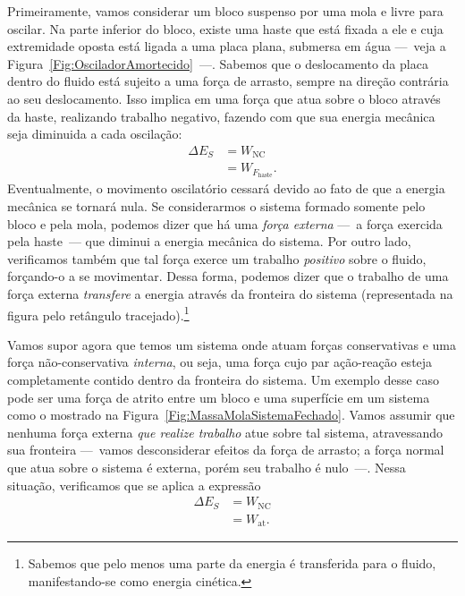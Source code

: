 Primeiramente, vamos considerar um bloco suspenso por uma mola e livre para oscilar. Na parte inferior do bloco, existe uma haste que está fixada a ele e cuja extremidade oposta está ligada a uma placa plana, submersa em água ---~veja a Figura~\ref{Fig:OsciladorAmortecido}~---. Sabemos que o deslocamento da placa dentro do fluido está sujeito a uma força de arrasto, sempre na direção contrária ao seu deslocamento. Isso implica em uma força que atua sobre o bloco através da haste, realizando trabalho negativo, fazendo com que sua energia mecânica seja diminuida a cada oscilação:
\begin{align}
    \Delta E_S &= W_{\textrm{NC}} \\
    &= W_{F_{\textrm{haste}}}.
\end{align}
%
Eventualmente, o movimento oscilatório cessará devido ao fato de que a energia mecânica se tornará nula. Se considerarmos o sistema formado somente pelo bloco e pela mola, podemos dizer que há uma \emph{força externa} ---~a força exercida pela haste~--- que diminui a energia mecânica do sistema. Por outro lado, verificamos também que tal força exerce um trabalho \emph{positivo} sobre o fluido, forçando-o a se movimentar. Dessa forma, podemos dizer que o trabalho de uma força externa \emph{transfere} a energia através da fronteira do sistema (representada na figura pelo retângulo tracejado).\footnote{Sabemos que pelo menos uma parte da energia é transferida para o fluido, manifestando-se como energia cinética.}

Vamos supor agora que temos um sistema onde atuam forças conservativas e uma força não-conservativa \emph{interna}, ou seja, uma força cujo par ação-reação esteja completamente contido dentro da fronteira do sistema. Um exemplo desse caso pode ser uma força de atrito entre um bloco e uma superfície em um sistema como o mostrado na Figura~\ref{Fig:MassaMolaSistemaFechado}. Vamos assumir que nenhuma força externa \emph{que realize trabalho} atue sobre tal sistema, atravessando sua fronteira ---~vamos desconsiderar efeitos da força de arrasto; a força normal que atua sobre o sistema é externa, porém seu trabalho é nulo~---. Nessa situação, verificamos que se aplica a expressão
\begin{align}
    \Delta E_S &= W_{\textrm{NC}} \\
    &= W_{\textrm{at}}.
\end{align}

